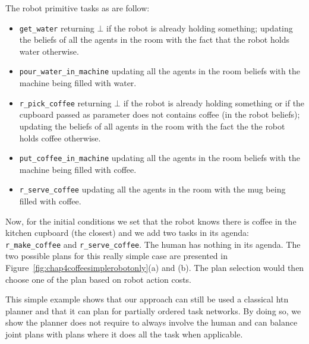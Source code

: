 \documentclass[a4paper,11pt,twoside]{StyleThese}
\begin{document}
The robot primitive tasks as are follow:
\begin{itemize}
\item \verb'get_water' returning $\bot$ if the robot is already holding something; updating the beliefs of all the agents in the room with the fact that the robot holds water otherwise.
\item \verb'pour_water_in_machine' updating all the agents in the room beliefs with the machine being filled with water.
\item \verb'r_pick_coffee' returning $\bot$ if the robot is already holding something or if the cupboard passed as parameter does not contains coffee (in the robot beliefs); updating the beliefs of all agents in the room with the fact the the robot holds coffee otherwise.
\item \verb'put_coffee_in_machine' updating all the agents in the room beliefs with the machine being filled with coffee.
\item \verb'r_serve_coffee' updating all the agents in the room with the mug being filled with coffee.
\end{itemize}

Now, for the initial conditions we set that the robot knows there is coffee in the kitchen cupboard (the closest) and we add two tasks in its agenda: \verb'r_make_coffee' and \verb'r_serve_coffee'. The human has nothing in its agenda. The two possible plans for this really simple case are presented in Figure~\ref{fig:chap4coffeesimplerobotonly}(a) and (b). The plan selection would then choose one of the plan based on robot action costs.

This simple example shows that our approach can still be used a classical \acrshort{htn} planner and that it can plan for partially ordered task networks. By doing so, we show the planner does not require to always involve the human and can balance joint plans with plans where it does all the task when applicable.
\end{document}
